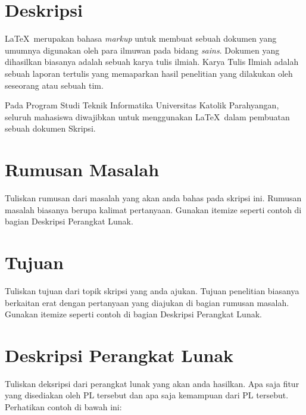 \documentclass[a4paper,twoside]{article}
\begin{document}
\title{\@judultopik}
\author{\nama \textendash \@npm} 

\newcommand{\nama}{Adli Fariz Bonaputra}
\newcommand{\@npm}{2012730082}
\newcommand{\@judultopik}{Konversi Javadoc ke \LaTeX} %
\newcommand{\jumpemb}{1} %
\newcommand{\tanggal}{01/01/1900}
\maketitle


\section{Deskripsi}
\LaTeX\ merupakan bahasa {\it markup} untuk membuat sebuah dokumen yang umumnya digunakan oleh para ilmuwan pada bidang {\it sains}. Dokumen yang dihasilkan biasanya adalah sebuah karya tulis ilmiah. Karya Tulis Ilmiah adalah sebuah laporan tertulis yang memaparkan hasil penelitian yang dilakukan oleh seseorang atau sebuah tim. %

Pada Program Studi Teknik Informatika Universitas Katolik Parahyangan, seluruh mahasiswa diwajibkan untuk menggunakan \LaTeX\ dalam pembuatan sebuah dokumen Skripsi.

\section{Rumusan Masalah}
Tuliskan rumusan dari masalah yang akan anda bahas pada skripsi ini. Rumusan masalah biasanya berupa kalimat pertanyaan. Gunakan itemize seperti contoh di bagian Deskripsi Perangkat Lunak.

\section{Tujuan}
Tuliskan tujuan dari topik skripsi yang anda ajukan. Tujuan penelitian biasanya berkaitan erat dengan pertanyaan yang diajukan di bagian rumusan masalah. Gunakan itemize seperti contoh di bagian Deskripsi Perangkat Lunak.

\section{Deskripsi Perangkat Lunak}
Tuliskan deksripsi dari perangkat lunak yang akan anda hasilkan. Apa saja fitur yang disediakan oleh PL tersebut dan apa saja kemampuan dari PL tersebut. Perhatikan contoh di bawah ini:
\end{document}
